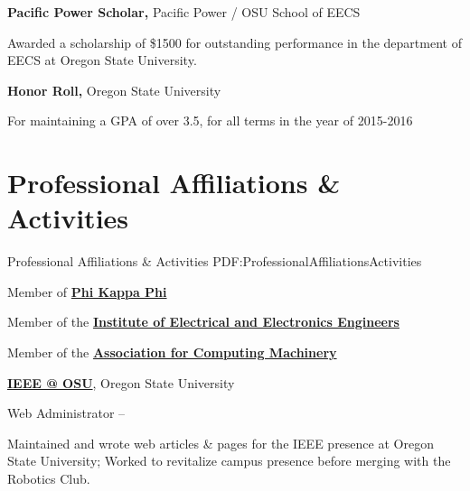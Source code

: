 \documentclass[letterpaper,MMMyyyy,nonstop]{simpleresumecv}
\begin{document}
\begin{body}
\textbf{Pacific Power Scholar,}
Pacific Power / OSU School of EECS
\GapNoBreak
\begin{detail}
\BulletItem
Awarded a scholarship of \$1500 for outstanding performance in the department of EECS at Oregon State University.
\end{detail}

\textbf{Honor Roll,}
Oregon State University
\GapNoBreak
\begin{detail}
\BulletItem
For maintaining a GPA of over 3.5, for all terms in the year of 2015-2016
\end{detail}

\iffalse
\Gap
\textbf{Computer Science Departmental Award,}
Wilsonville High School
\GapNoBreak
\begin{detail}
\BulletItem
Awarded for exemplar efforts in studies in the department of Computer Science; volunteered senior year to create and maintain a computer lab of 32 machines running Xubuntu GNU/Linux for use in Physics, Digital Photography, and AP Computer Science courses; served as peer mentor for AP Computer Science.
\end{detail}
\fi


\section
{Professional Affiliations\newline
\& Activities}
{Professional Affiliations \& Activities}
{PDF:ProfessionalAffiliationsActivities}

Member of 
\href{https://www.phikappaphi.org/}
{\textbf{Phi Kappa Phi}}

Member of the
\href{http://www.ieee.org}
{\textbf{Institute of Electrical and Electronics Engineers}}

Member of the
\href{http://www.acm.org}
{\textbf{Association for Computing Machinery}}

\Gap

\href{http://groups.engr.oregonstate.edu/ieee-new}
{\textbf{IEEE @ OSU}},
Oregon State University

\GapNoBreak
\BulletItem
Web Administrator
\hfill
{} --
\begin{detail}
\SubBulletItem
Maintained and wrote web articles \& pages for the IEEE presence at Oregon State University; Worked to revitalize campus presence before merging with the Robotics Club.
\end{detail}


\end{body}
\end{document}
